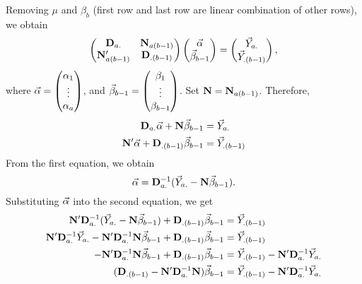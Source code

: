 Removing $ \mu $ and $ \beta_b $ (first row and last row are linear combination of other rows), we obtain
\[ \begin{pmatrix}
        \mathbf{D}_{a.}      & \mathbf{N}_{a(b-1)} \\
        \mathbf{N}_{a(b-1)}' & \mathbf{D}_{.(b-1)}
    \end{pmatrix}\begin{pmatrix}
        \vec{\alpha} \\
        \vec{\beta}_{b-1}
    \end{pmatrix}=\begin{pmatrix}
        \vec{Y}_{a.} \\
        \vec{Y}_{.(b-1)}
    \end{pmatrix}, \]
where $ \vec{\alpha}=\begin{pmatrix}
        \alpha_1 \\
        \vdots   \\
        \alpha_a
    \end{pmatrix} $, and $ \vec{\beta}_{b-1} =\begin{pmatrix}
        \beta_1 \\
        \vdots  \\
        \beta_{b-1}
    \end{pmatrix} $. Set $ \mathbf{N}=\mathbf{N}_{a(b-1)} $.
Therefore,
\begin{align*}
    \mathbf{D}_{a.}\vec{\alpha}+\mathbf{N}\vec{\beta}_{b-1}      & =\vec{Y}_{a.}     \\
    \mathbf{N}'\vec{\alpha}+\mathbf{D}_{.(b-1)}\vec{\beta}_{b-1} & =\vec{Y}_{.(b-1)}
\end{align*}
From the first equation, we obtain
\[ \vec{\alpha}=\mathbf{D}_{a.}^{-1}(\vec{Y}_{a.}-\mathbf{N}\vec{\beta}_{b-1}). \]
Substituting $ \vec{\alpha} $ into the second equation, we get
\begin{align*}
    \mathbf{N}'\mathbf{D}_{a.}^{-1}(\vec{Y}_{a.}-\mathbf{N}\vec{\beta}_{b-1})+\mathbf{D}_{.(b-1)}\vec{\beta}_{b-1}                              & =\vec{Y}_{.(b-1)}                                                \\
    \mathbf{N}'\mathbf{D}_{a.}^{-1}\vec{Y}_{a.}-\mathbf{N}'\mathbf{D}_{a.}^{-1}\mathbf{N}\vec{\beta}_{b-1}+\mathbf{D}_{.(b-1)}\vec{\beta}_{b-1} & =\vec{Y}_{.(b-1)}                                                \\
    -\mathbf{N}'\mathbf{D}_{a.}^{-1}\mathbf{N}\vec{\beta}_{b-1}+\mathbf{D}_{.(b-1)}\vec{\beta}_{b-1}                                               & =\vec{Y}_{.(b-1)}-\mathbf{N}'\mathbf{D}_{a.}^{-1}\vec{Y}_{a.} \\
    (\mathbf{D}_{.(b-1)}-\mathbf{N}'\mathbf{D}_{a.}^{-1}\mathbf{N})\vec{\beta}_{b-1}                                                                  & =\vec{Y}_{.(b-1)}-\mathbf{N}'\mathbf{D}_{a.}^{-1}\vec{Y}_{a.} \\
\end{align*}
